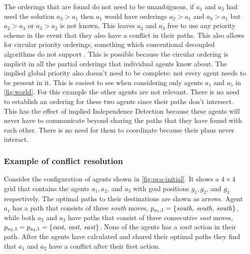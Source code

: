 The orderings that are found do not need to be unambiguous, if $a_1$ and $a_3$
had used the solution $a_3 > a_1$ then $a_1$ would have orderings $a_2 > a_1$
and $a_3 > a_1$ but $a_2 > a_3$ or $a_3 > a_2$ is not known. This leaves $a_2$ 
and $a_3$
free to use any priority scheme in the event that they also have a conflict in
their paths. This also allows for circular priority orderings, something which
conventional decoupled algorithms do not support \cite{bennewitz2002}. This is 
possible because the
circular ordering is implicit in all the partial orderings that individual
agents know about. The implied global priority also doesn't need to be
complete: not every agent needs to be present in it. This is easiest to see
when considering only agents $a_1$ and $a_5$ in \autoref{fig:world}. For this
example the other agents are not relevant. There is no need to establish an
ordering for these two agents since their paths don't intersect. This has the 
effect
of implied Independence Detection \cite{standley2010} because these agents will
never have to communicate beyond sharing the paths that they have found with
each other. There is no need for them to coordinate because their plans never
interact.


\subsubsection{Example of conflict resolution}

Consider the configuration of agents shown in \autoref{fig:pca-initial}. It 
shows a $4 \times 4$ grid that contains the agents $a_1, a_2$, and $a_3$ with 
goal positions $g_1, g_2$, and $g_3$ respectively. The optimal paths to their 
destinations are shown as arrows. Agent $a_1$ has a path that consists of three 
\emph{south} moves, $p_{a_1,1} = \{\text{\emph{south, south, south}}\}$, while 
both $a_2$ and $a_3$ have paths that consist of three consecutive \emph{east} 
moves, $p_{a_2,1} = p_{a_3,1} = \{\text{\emph{east, east, east}}\}$. None of 
the agents has a \emph{wait} action in their path. After the agents have 
calculated and shared 
their optimal paths they find that $a_1$ and $a_2$ have a conflict after their 
first action. 

